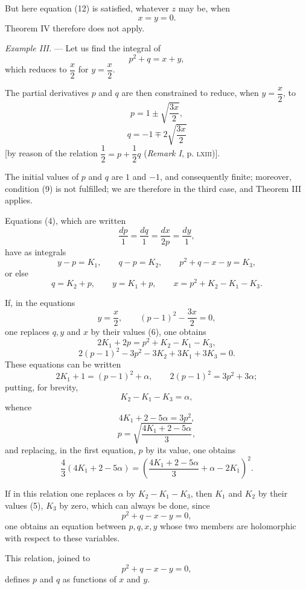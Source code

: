 \documentclass[11pt]{article}
\begin{document}
But here equation (12) is satisfied, whatever $z$ may be, when
\[
x=y=0.
\]
Theorem IV therefore does not apply.

\emph{Example III.} — Let us find the integral of
\[
p^2+q=x+y,
\]
which reduces to $\dfrac{x}{2}$ for $y=\dfrac{x}{2}$.

The partial derivatives $p$ and $q$ are then constrained to reduce, when $y=\dfrac{x}{2}$, to
\[
p=1\pm\sqrt{\frac{3x}{2}},
\]
\[
q=-1\mp 2\sqrt{\frac{3x}{2}}
\]
[by reason of the relation $\dfrac12=p+\dfrac12q$ (\emph{Remark I}, p. \textsc{lxiii})].

The initial values of $p$ and $q$ are $1$ and $-1$, and consequently finite; moreover, condition (9) is not fulfilled; we are therefore in the third case, and Theorem III applies.

Equations (4), which are written
\[
\frac{dp}{1}=\frac{dq}{1}=\frac{dx}{2p}=\frac{dy}{1},
\]
have as integrals
\begin{equation*}\tag{5}
y-p=K_1,
\qquad q-p=K_2,
\qquad p^2+q-x-y=K_3,
\end{equation*}
or else
\begin{equation*}\tag{6}
q=K_2+p,
\qquad y=K_1+p,
\qquad x=p^2+K_2-K_1-K_3.
\end{equation*}

If, in the equations
\[
y=\frac{x}{2},
\qquad (p-1)^2-\frac{3x}{2}=0,
\]
one replaces $q,y$ and $x$ by their values (6), one obtains
\[
2K_1+2p=p^2+K_2-K_1-K_3,
\]
\[
2(p-1)^2-3p^2-3K_2+3K_1+3K_3=0.
\]
These equations can be written
\[
2K_1+1=(p-1)^2+\alpha,
\qquad 2(p-1)^2=3p^2+3\alpha;
\]
putting, for brevity,
\[
K_2-K_1-K_3=\alpha,
\]
whence
\[
4K_1+2-5\alpha=3p^2,
\]
\begin{equation*}\tag{13}
p=\sqrt{\frac{4K_1+2-5\alpha}{3}},
\end{equation*}
and replacing, in the first equation, $p$ by its value, one obtains
\begin{equation*}\tag{14}
\frac{4}{3}(4K_1+2-5\alpha)=
\left(\frac{4K_1+2-5\alpha}{3}+\alpha-2K_1\right)^2.
\end{equation*}

If in this relation one replaces $\alpha$ by $K_2-K_1-K_3$, then $K_1$ and $K_2$ by their values (5), $K_3$ by zero, which can always be done, since
\[
p^2+q-x-y=0,
\]
one obtains an equation between $p,q,x,y$ whose two members are holomorphic with respect to these variables.

This relation, joined to
\[
p^2+q-x-y=0,
\]
defines $p$ and $q$ as functions of $x$ and $y$.
\end{document}
